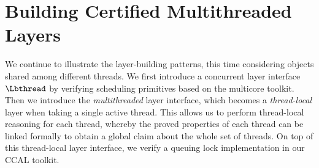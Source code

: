 \section{Building Certified Multithreaded Layers}
\label{sec:multithreaded-layers}
We continue to illustrate the layer-building patterns, this time
considering objects shared among different threads.
We first introduce a concurrent layer interface $\Lbthread$ by verifying
scheduling primitives based on the multicore toolkit.
Then we introduce the \emph{multithreaded} layer interface, which becomes a \emph{thread-local} layer
when taking a single active thread.
This allows us to perform thread-local reasoning for each thread, whereby the proved properties of each thread can be linked formally
to obtain a global claim about the whole set of threads.
On top of this thread-local layer interface,
we verify a queuing lock implementation  in our CCAL toolkit. 

